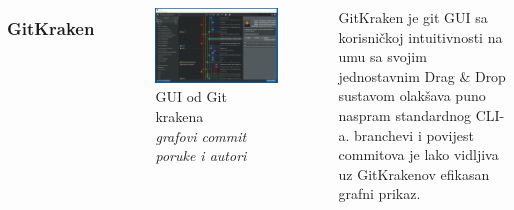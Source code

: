 \documentclass[hyperref={bookmarks=false},aspectratio=169]{beamer}
\begin{document}
\begin{frame}
\begin{columns}
\frametitle{GitKraken}
\begin{figure}


\includegraphics[width=\columnwidth]{./figures/git_kraken.png}
    \centering
    \caption{GUI od Git krakena  \emph{\\grafovi commit poruke i autori}}
\end{figure}
GitKraken je git GUI sa korisničkoj intuitivnosti na umu sa svojim jednostavnim Drag & Drop sustavom olakšava puno naspram standardnog CLI-a. branchevi i povijest commitova je lako vidljiva uz GitKrakenov efikasan grafni prikaz.
\end{columns}

\end{frame}
\end{document}
